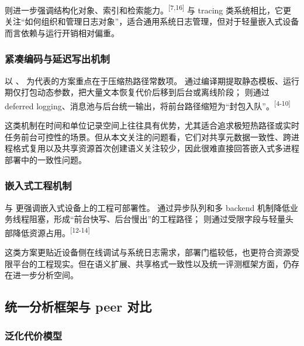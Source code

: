  则进一步强调结构化对象、索引和检索能力。\textsuperscript{[7,16]} 与 tracing 类系统相比，它更关注``如何组织和管理日志对象''，适合通用系统日志管理，但对于轻量嵌入式设备而言依赖与运行开销相对偏重。

\subsubsection{紧凑编码与延迟写出机制}\label{ux7d27ux51d1ux7f16ux7801ux4e0eux5ef6ux8fdfux5199ux51faux673aux5236}

以 、 为代表的方案重点在于压缩热路径常数项。 通过编译期提取静态模板、运行期仅打包动态参数，把大量文本恢复代价后移到后台或离线阶段； 则通过 deferred logging、消息池与后台统一输出，将前台路径缩短为``封包入队''。\textsuperscript{[4-10]}

这类机制在时间和单位记录空间上往往具有优势，尤其适合追求极短热路径或实时任务前台可控性的场景。但从本文关注的问题看，它们对共享元数据一致性、跨进程格式复用以及共享资源首次创建语义关注较少，因此很难直接回答嵌入式多进程部署中的一致性问题。

\subsubsection{嵌入式工程机制}\label{ux5d4cux5165ux5f0fux5de5ux7a0bux673aux5236}

 与  更强调嵌入式设备上的工程可部署性。 通过异步队列和多 backend 机制降低业务线程阻塞，形成``前台快写、后台慢出''的工程路径； 则通过受限字段与轻量头部降低资源占用。\textsuperscript{[12-14]}

这类方案更贴近设备侧在线调试与系统日志需求，部署门槛较低，也更符合资源受限平台的工程现实。但在语义扩展、共享格式一致性以及统一评测框架方面，仍存在进一步分析空间。

\subsection{统一分析框架与 peer 对比}\label{ux7edfux4e00ux5206ux6790ux6846ux67b6ux4e0e-peer-ux5bf9ux6bd4}

\subsubsection{泛化代价模型}\label{ux6cdbux5316ux4ee3ux4ef7ux6a21ux578b}

